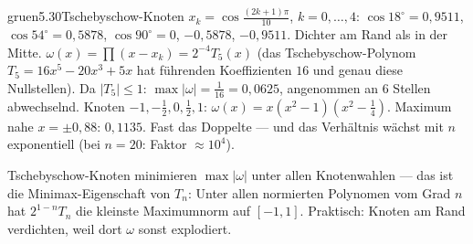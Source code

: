\begin{loesungkarte}{gruen}{5.30}{Tschebyschow-Knoten}
$x_k = \cos\frac{(2k + 1)\pi}{10}$, $k = 0, \dots, 4$: $\cos18^{\circ} = 0{,}9511$, $\cos54^{\circ} = 0{,}5878$, $\cos90^{\circ} = 0$, $-0{,}5878$, $-0{,}9511$. Dichter am Rand als in der Mitte.
\schritt{$\max|\omega|$}
$\omega(x) = \prod(x - x_k) = 2^{-4}T_5(x)$ (das Tschebyschow-Polynom $T_5 = 16x^{5} - 20x^{3} + 5x$ hat führenden Koeffizienten $16$ und genau diese Nullstellen). Da $|T_5|\le1$: $\max|\omega| = \frac1{16} = 0{,}0625$, angenommen an $6$ Stellen abwechselnd.
Knoten $-1, -\frac12, 0, \frac12, 1$: $\omega(x) = x(x^{2} - 1)(x^{2} - \frac14)$. Maximum nahe $x = \pm0{,}88$: $0{,}1135$. Fast das Doppelte --- und das Verhältnis wächst mit $n$ exponentiell (bei $n = 20$: Faktor $\approx10^{4}$).
\begin{mitnehmen}\kastentext
Tschebyschow-Knoten minimieren $\max|\omega|$ unter allen Knotenwahlen --- das ist die Minimax-Eigenschaft von $T_n$: Unter allen normierten Polynomen vom Grad $n$ hat $2^{1-n}T_n$ die kleinste Maximumnorm auf $[-1, 1]$. Praktisch: Knoten am Rand verdichten, weil dort $\omega$ sonst explodiert.
\end{mitnehmen}
\end{loesungkarte}

